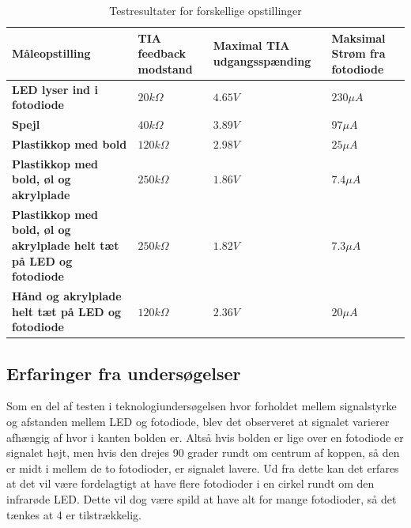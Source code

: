 \documentclass[HardwareDesign/HardwareDesign_main.tex]{subfiles}
\begin{document}
{\begin{table}[H]
\begin{tabular}{|L{0.25\textwidth}|L{0.25\textwidth}|L{0.25\textwidth}|L{0.25\textwidth}|}
\hline
\textbf{Måleopstilling} & \textbf{TIA feedback modstand} & \textbf{Maximal TIA udgangsspænding} & \textbf{Maksimal Strøm fra fotodiode} \\ \hline
\textbf{LED lyser ind i fotodiode} & $20\si{k\Omega}$ & $4.65\si{V}$ & $230\si{\mu A}$ \\ \hline
\textbf{Spejl} & $40\si{k\Omega}$ & $3.89\si{V}$ & $97\si{\mu A}$ \\ \hline
\textbf{Plastikkop med bold} & $120\si{k\Omega}$ & $2.98\si{V}$ & $25\si{\mu A}$ \\ \hline
\textbf{Plastikkop med bold, øl og akrylplade} & $250\si{k\Omega}$ & $1.86\si{V}$ & $7.4\si{\mu A}$ \\ \hline
\textbf{Plastikkop med bold, øl og akrylplade helt tæt på LED og fotodiode} & $250\si{k\Omega}$ & $1.82\si{V}$ & $7.3\si{\mu A}$ \\ \hline
\textbf{Hånd og akrylplade helt tæt på LED og fotodiode} & $120\si{k\Omega}$ & $2.36\si{V}$ & $20\si{\mu A}$ \\ \hline
\end{tabular}
\caption{Testresultater for forskellige opstillinger}
\label{tab:CupSensorCurrentTest}
\end{table}
}


\subsection{Erfaringer fra undersøgelser} \label{sec:CupSensorErfaringer}

Som en del af testen i teknologiundersøgelsen hvor forholdet mellem signalstyrke og afstanden mellem LED og fotodiode, blev det observeret at signalet varierer afhængig af hvor i kanten bolden er. Altså hvis bolden er lige over en fotodiode er signalet højt, men hvis den drejes 90 grader rundt om centrum af koppen, så den er midt i mellem de to fotodioder, er signalet lavere. Ud fra dette kan det erfares at det vil være fordelagtigt at have flere fotodioder i en cirkel rundt om den infrarøde LED. Dette vil dog være spild at have alt for mange fotodioder, så det tænkes at 4 er tilstrækkelig.

\end{document}

